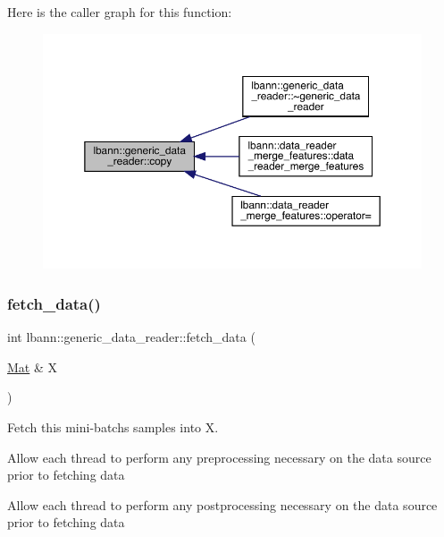 Here is the caller graph for this function\+:\nopagebreak
\begin{figure}[H]
\begin{center}
\leavevmode
\includegraphics[width=350pt]{classlbann_1_1generic__data__reader_a208ba1223e7aaa75e94b728501f12f86_icgraph}
\end{center}
\end{figure}
\mbox{\label{classlbann_1_1generic__data__reader_a46b658ba4f6b746632b683568ab76f77}} 
\subsubsection{\texorpdfstring{fetch\+\_\+data()}{fetch\_data()}}
{\footnotesize\ttfamily int lbann\+::generic\+\_\+data\+\_\+reader\+::fetch\+\_\+data (\begin{DoxyParamCaption}\item[{\hyperlink{base_8hpp_a68f11fdc31b62516cb310831bbe54d73}{Mat} \&}]{X }\end{DoxyParamCaption})\hspace{0.3cm}{\ttfamily [virtual]}}



Fetch this mini-\/batch\textquotesingle{}s samples into X. 

Allow each thread to perform any preprocessing necessary on the data source prior to fetching data

Allow each thread to perform any postprocessing necessary on the data source prior to fetching data 

